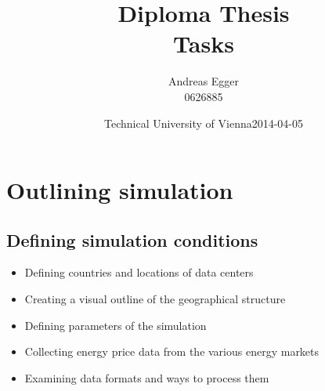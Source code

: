 \documentclass[a4paper]{article}
\title{Diploma Thesis\\Tasks}
\author{Andreas Egger \\0626885}
\date{Technical University of Vienna}
\begin{document}
\maketitle

\newpage

\tableofcontents

\newpage

\section{Outlining simulation}
\hfill\date{2014-04-05}

\subsection{Defining simulation conditions}

\begin{itemize}

\item Defining countries and locations of data centers

\item Creating a visual outline of the geographical structure

\item Defining parameters of the simulation

\item Collecting energy price data from the various energy markets

\item Examining data formats and ways to process them


\end{itemize}
\end{document}
